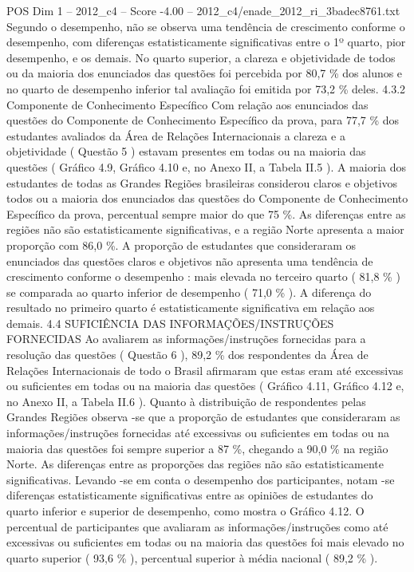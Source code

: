 \begin{textsample}{POS Dim 1 – 2012\_c4 – Score -4.00 – 2012\_c4/enade\_2012\_ri\_3badec8761.txt}
Segundo o desempenho, não se observa uma tendência de crescimento conforme o desempenho, com diferenças estatisticamente significativas entre o 1º quarto, pior desempenho, e os demais.
No quarto superior, a clareza e objetividade de todos ou da maioria dos enunciados das questões foi percebida por 80,7 \% dos alunos e no quarto de desempenho inferior tal avaliação foi emitida por 73,2 \% deles. 4.3.2 Componente de Conhecimento Específico Com relação aos enunciados das questões do Componente de Conhecimento Específico da prova, para 77,7 \% dos estudantes avaliados da Área de Relações Internacionais a clareza e a objetividade ( Questão 5 ) estavam presentes em todas ou na maioria das questões ( Gráfico 4.9, Gráfico 4.10 e, no Anexo II, a Tabela II.5 ).
A maioria dos estudantes de todas as Grandes Regiões brasileiras considerou claros e objetivos todos ou a maioria dos enunciados das questões do Componente de Conhecimento Específico da prova, percentual sempre maior do que 75 \%.
As diferenças entre as regiões não são estatisticamente significativas, e a região Norte apresenta a maior proporção com 86,0 \%.
A proporção de estudantes que consideraram os enunciados das questões claros e objetivos não apresenta uma tendência de crescimento conforme o desempenho : mais elevada no terceiro quarto ( 81,8 \% ) se comparada ao quarto inferior de desempenho ( 71,0 \% ).
A diferença do resultado no primeiro quarto é estatisticamente significativa em relação aos demais. 4.4 SUFICIÊNCIA DAS INFORMAÇÕES/INSTRUÇÕES FORNECIDAS Ao avaliarem as informações/instruções fornecidas para a resolução das questões ( Questão 6 ), 89,2 \% dos respondentes da Área de Relações Internacionais de todo o Brasil afirmaram que estas eram até excessivas ou suficientes em todas ou na maioria das questões ( Gráfico 4.11, Gráfico 4.12 e, no Anexo II, a Tabela II.6 ).
Quanto à distribuição de respondentes pelas Grandes Regiões observa -se que a proporção de estudantes que consideraram as informações/instruções fornecidas até excessivas ou suficientes em todas ou na maioria das questões foi sempre superior a 87 \%, chegando a 90,0 \% na região Norte.
As diferenças entre as proporções das regiões não são estatisticamente significativas.
Levando -se em conta o desempenho dos participantes, notam -se diferenças estatisticamente significativas entre as opiniões de estudantes do quarto inferior e superior de desempenho, como mostra o Gráfico 4.12.
O percentual de participantes que avaliaram as informações/instruções como até excessivas ou suficientes em todas ou na maioria das questões foi mais elevado no quarto superior ( 93,6 \% ), percentual superior à média nacional ( 89,2 \% ).

\end{textsample}

